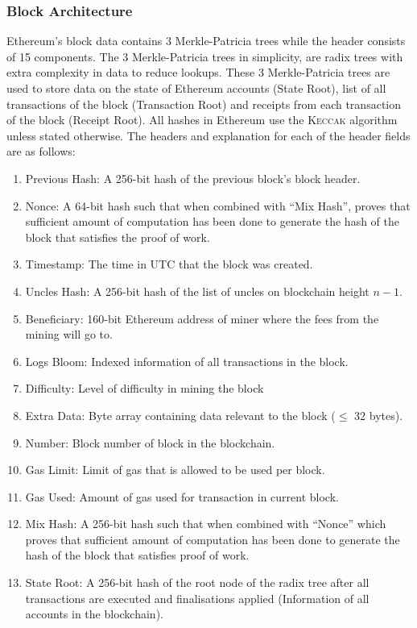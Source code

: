 \documentclass[a4paper,12pt]{article}
\begin{document}
{\subsubsection{Block Architecture}
{\par Ethereum's block data contains 3 Merkle-Patricia trees while the header consists of 15 components. The 3 Merkle-Patricia trees in simplicity, are radix trees with extra complexity in data to reduce lookups. These 3 Merkle-Patricia trees are used to store data on the state of Ethereum accounts (State Root), list of all transactions of the block (Transaction Root) and receipts from each transaction of the block (Receipt Root). All hashes in Ethereum use the \textsc{Keccak} algorithm unless stated otherwise. The headers and explanation for each of the header fields are as follows:
	\begin{enumerate}
		\item Previous Hash: A 256-bit hash of the previous block's block header.
		\item Nonce: A 64-bit hash such that when combined with ``Mix Hash'', proves that sufficient amount of computation has been done to generate the hash of the block that satisfies the proof of work.
		\item Timestamp: The time in UTC that the block was created.
		\item Uncles Hash: A 256-bit hash of the list of uncles on blockchain height $n-1$.
		\item Beneficiary: 160-bit Ethereum address of miner where the fees from the mining will go to.
		\item Logs Bloom: Indexed information of all transactions in the block.
		\item Difficulty: Level of difficulty in mining the block
		\item Extra Data: Byte array containing data relevant to the block ($\leq$ 32 bytes).
		\item Number: Block number of block in the blockchain.
		\item Gas Limit:  Limit of gas that is allowed to be used per block.
		\item Gas Used: Amount of gas used for transaction in current block.
		\item Mix Hash: A 256-bit hash such that when combined with ``Nonce'' which proves that sufficient amount of computation has been done to generate the hash of the block that satisfies proof of work.		
		\item State Root: A 256-bit hash of the root node of the radix tree after all transactions are executed and finalisations applied (Information of all accounts in the blockchain).

\end{enumerate}}}
\end{document}
